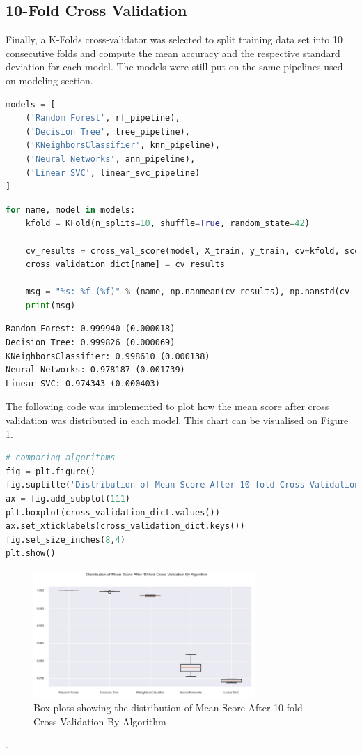 \documentclass{article}
\begin{document}
\subsection{10-Fold Cross Validation}
Finally, a K-Folds cross-validator was selected to split training data set into 10 consecutive folds and compute the mean accuracy and the respective standard deviation for each model. The models were still put on the same pipelines used on modeling section.

\begin{lstlisting}[language=Python]
models = [    
    ('Random Forest', rf_pipeline), 
    ('Decision Tree', tree_pipeline),
    ('KNeighborsClassifier', knn_pipeline),    
    ('Neural Networks', ann_pipeline), 
    ('Linear SVC', linear_svc_pipeline)
]
\end{lstlisting}
\begin{lstlisting}[language=Python]
for name, model in models:
    kfold = KFold(n_splits=10, shuffle=True, random_state=42)
    
    cv_results = cross_val_score(model, X_train, y_train, cv=kfold, scoring='accuracy')
    cross_validation_dict[name] = cv_results

    msg = "%s: %f (%f)" % (name, np.nanmean(cv_results), np.nanstd(cv_results))
    print(msg)
\end{lstlisting}
\begin{verbatim}
Random Forest: 0.999940 (0.000018)
Decision Tree: 0.999826 (0.000069)
KNeighborsClassifier: 0.998610 (0.000138)
Neural Networks: 0.978187 (0.001739)
Linear SVC: 0.974343 (0.000403)
\end{verbatim}

The following code was implemented to plot how the mean score after cross validation was distributed in each model. This chart can be visualised on Figure \ref{fig:10_fold_cv}.

\begin{lstlisting}[language=Python]
# comparing algorithms
fig = plt.figure()
fig.suptitle('Distribution of Mean Score After 10-fold Cross Validation By Algorithm')
ax = fig.add_subplot(111)
plt.boxplot(cross_validation_dict.values())
ax.set_xticklabels(cross_validation_dict.keys())
fig.set_size_inches(8,4)
plt.show()
\end{lstlisting}

\begin{figure}
\centering
\includegraphics[width=0.75\textwidth]{10_fold_cv.png}
\caption{\label{fig:10_fold_cv}Box plots showing the distribution of Mean Score After 10-fold Cross Validation By Algorithm}
\end{figure}.
\end{document}
